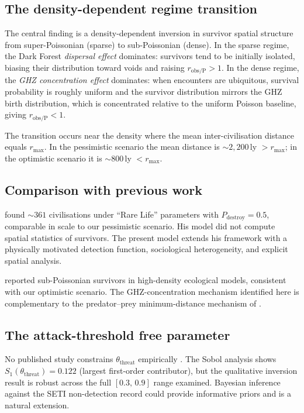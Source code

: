 \documentclass[useAMS,usenatbib]{mn2e}
\begin{document}
\subsection{The density-dependent regime transition}

The central finding is a density-dependent inversion in survivor
spatial structure from super-Poissonian (sparse) to sub-Poissonian
(dense).
In the sparse regime, the Dark Forest \emph{dispersal effect}
dominates: survivors tend to be initially isolated, biasing their
distribution toward voids and raising $r_\text{obs/P} > 1$.
In the dense regime, the \emph{GHZ concentration effect} dominates:
when encounters are ubiquitous, survival probability is roughly
uniform and the survivor distribution mirrors the GHZ birth
distribution, which is concentrated relative to the uniform Poisson
baseline, giving $r_\text{obs/P} < 1$.

The transition occurs near the density where the mean
inter-civilisation distance equals $r_\text{max}$.
In the pessimistic scenario the mean distance is $\sim 2{,}200$\,ly
$> r_\text{max}$; in the optimistic scenario it is $\sim 800$\,ly
$< r_\text{max}$.

\subsection{Comparison with previous work}

\citet{forgan2009} found $\sim 361$ civilisations under ``Rare Life''
parameters with $P_\text{destroy} = 0.5$, comparable in scale to
our pessimistic scenario.
His model did not compute spatial statistics of survivors.
The present model extends his framework with a physically motivated
detection function, sociological heterogeneity, and explicit spatial
analysis.

\citet{foucher2023} reported sub-Poissonian survivors in high-density
ecological models, consistent with our optimistic scenario.
The GHZ-concentration mechanism identified here is complementary to
the predator--prey minimum-distance mechanism of \citet{foucher2023}.

\subsection{The attack-threshold free parameter}

No published study constrains $\theta_\text{threat}$ empirically
\citep{devladar2013}.
The Sobol analysis shows $S_1(\theta_\text{threat}) = 0.122$
(largest first-order contributor), but the qualitative inversion
result is robust across the full $[0.3,\,0.9]$ range examined.
Bayesian inference against the SETI non-detection record could
provide informative priors and is a natural extension.
\end{document}
